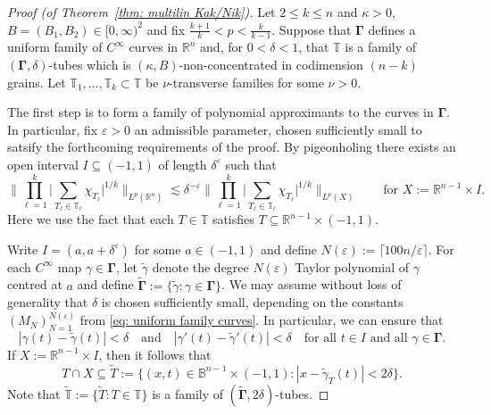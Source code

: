 \documentclass[reqno]{amsart}
\numberwithin{equation}{section}
\newcommand{\B}{\mathbb{B}}
\newcommand{\R}{\mathbb{R}}
\newcommand{\T}{\mathbb{T}}
\newcommand{\bdGamma}{\boldsymbol{\Gamma}}
\theoremstyle{plain}
\theoremstyle{definition}
\newcommand{\ceil}[1]{\lceil #1 \rceil }
\begin{document}
\begin{proof}[Proof (of Theorem~\ref{thm: multilin Kak/Nik})] Let $2 \leq k \leq n$ and $\kappa > 0$, $B = (B_1, B_2) \in [0,\infty)^2$ and fix $\frac{k+1}{k} < p < \frac{k}{k-1}$. Suppose that $\bdGamma$ defines a uniform family of $C^{\infty}$ curves in $\R^n$ and, for $0 < \delta < 1$, that $\T$ is a family of $(\bdGamma, \delta)$-tubes which is $(\kappa, B)$-non-concentrated in codimension $(n-k)$ grains. Let $\T_1, \dots, \T_k \subset \T$ be $\nu$-transverse families for some $\nu > 0$. 

The first step is to form a family of polynomial approximants to the curves in $\bdGamma$. In particular, fix $\varepsilon > 0$ an admissible parameter, chosen sufficiently small to satsify the forthcoming requirements of the proof. By pigeonholing there exists an open interval $I \subseteq (-1,1)$ of length $\delta^{\varepsilon}$ such that
\begin{equation}\label{eq: alg endgame 1}
\Big\|\prod_{\ell = 1}^k \big| \sum_{T_{\ell} \in \T_{\ell}} \chi_{T_{\ell}} \big|^{1/k} \Big\|_{L^p(\R^n)} \lesssim    \delta^{-\varepsilon} \Big\|\prod_{\ell = 1}^k \big| \sum_{T_{\ell} \in \T_{\ell}} \chi_{T_{\ell}} \big|^{1/k} \Big\|_{L^p(X)} \qquad \textrm{for $X := \R^{n-1} \times I$.}
\end{equation}
Here we use the fact that each $T \in \T$ satisfies $T \subseteq \R^{n-1} \times (-1,1)$. 

Write $I = (a, a+\delta^{\varepsilon})$ for some $a \in (-1,1)$ and define
$N(\varepsilon) := \ceil{100n/\varepsilon}$. For each $C^{\infty}$ map $\gamma \in \bdGamma$, let $\widetilde{\gamma}$ denote the degree $N(\varepsilon)$ Taylor polynomial of $\gamma$ centred at $a$ and define $\widetilde{\bdGamma} := \{ \widetilde{\gamma} : \gamma \in \bdGamma\}$. We may assume without loss of generality that $\delta$ is chosen sufficiently small, depending on the constants $(M_N)_{N = 1}^{N(\varepsilon)}$ from \eqref{eq: uniform family curves}. In particular, we can ensure that
\begin{equation}\label{eq: alg endgame 2}
    |\gamma(t) - \widetilde{\gamma}(t)| < \delta \quad \textrm{and} \quad  |\gamma'(t) - \widetilde{\gamma}'(t)| < \delta \quad \textrm{for all $t \in I$ and all $\gamma \in \bdGamma$.}
\end{equation}
If $X := \R^{n-1} \times I$, then it follows that
\begin{equation}\label{eq: alg endgame 3}
    T \cap X \subseteq \widetilde{T} := \big\{(x,t) \in \B^{n-1} \times (-1,1) : |x - \widetilde{\gamma}_T(t)| < 2\delta \big\}.
\end{equation}
Note that $\widetilde{\T} := \{\widetilde{T} : T \in \T\}$ is a family of $(\widetilde{\bdGamma}, 2\delta)$-tubes. 


\end{proof}
\end{document}
